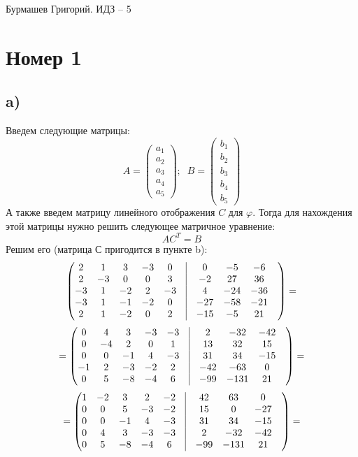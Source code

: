 \documentclass[a4paper,12pt]{article}
\author{Бурмашев Григорий, БПМИ-208}
\title{}
\date{\today}
\begin{document}
\begin{center}
Бурмашев Григорий.  ИДЗ -- 5
\end{center}
\section*{Номер 1}
\subsection*{a)}
Введем следующие матрицы:
\[
A = \begin{pmatrix}
a_1 \\a_2 \\ a_3 \\ a_4 \\ a_5
\end{pmatrix}
; \; \;
B = \begin{pmatrix}
b_1 \\ b_2 \\ b_3 \\ b_4 \\ b_5
\end{pmatrix}
\]
А также введем матрицу линейного отображения $C$ для $\varphi$. Тогда для нахождения этой матрицы нужно решить следующее матричное уравнение:
\[
AC^T = B
\]
Решим его (матрица С пригодится в пункте b):
\[
\begin{pmatrix}
2 & 1 & 3 & -3 & 0 & \vrule &0 & -5 & -6 & \\
2 & -3 & 0 & 0 & 3 & \vrule &-2 & 27 & 36 & \\
-3 & 1 & -2 & 2 & -3 & \vrule &4 & -24 & -36 & \\
-3 & 1 & -1 & -2 & 0 & \vrule &-27 & -58 & -21 & \\
2 & 1 & -2 & 0 & 2 & \vrule &-15 & -5 & 21 & \\
\end{pmatrix}
=
\]
\[
=
\begin{pmatrix}
0 & 4 & 3 & -3 & -3 & \vrule &2 & -32 & -42 & \\
0 & -4 & 2 & 0 & 1 & \vrule &13 & 32 & 15 & \\
0 & 0 & -1 & 4 & -3 & \vrule &31 & 34 & -15 & \\
-1 & 2 & -3 & -2 & 2 & \vrule &-42 & -63 & 0 & \\
0 & 5 & -8 & -4 & 6 & \vrule &-99 & -131 & 21 & \\
\end{pmatrix}
=
\]
\[
=
\begin{pmatrix}
1 & -2 & 3 & 2 & -2 & \vrule &42 & 63 & 0 & \\
0 & 0 & 5 & -3 & -2 & \vrule &15 & 0 & -27 & \\
0 & 0 & -1 & 4 & -3 & \vrule &31 & 34 & -15 & \\
0 & 4 & 3 & -3 & -3 & \vrule &2 & -32 & -42 & \\
0 & 5 & -8 & -4 & 6 & \vrule &-99 & -131 & 21 & \\
\end{pmatrix}
=
\]
\end{document}
